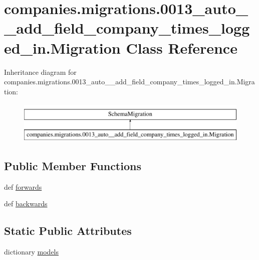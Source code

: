 \hypertarget{classcompanies_1_1migrations_1_10013__auto____add__field__company__times__logged__in_1_1_migration}{\section{companies.\-migrations.0013\-\_\-auto\-\_\-\-\_\-add\-\_\-field\-\_\-company\-\_\-times\-\_\-logged\-\_\-in.Migration Class Reference}
\label{classcompanies_1_1migrations_1_10013__auto____add__field__company__times__logged__in_1_1_migration}
}
Inheritance diagram for companies.\-migrations.0013\-\_\-auto\-\_\-\-\_\-add\-\_\-field\-\_\-company\-\_\-times\-\_\-logged\-\_\-in.Migration\-:\begin{figure}[H]
\begin{center}
\leavevmode
\includegraphics[height=2.000000cm]{classcompanies_1_1migrations_1_10013__auto____add__field__company__times__logged__in_1_1_migration}
\end{center}
\end{figure}
\subsection*{Public Member Functions}
\begin{DoxyCompactItemize}
\item 
def \hyperlink{classcompanies_1_1migrations_1_10013__auto____add__field__company__times__logged__in_1_1_migration_a26a0af430d99c0054c8e80672210e457}{forwards}
\item 
def \hyperlink{classcompanies_1_1migrations_1_10013__auto____add__field__company__times__logged__in_1_1_migration_a812aba8dcbe5ea614b9ec84042078d3e}{backwards}
\end{DoxyCompactItemize}
\subsection*{Static Public Attributes}
\begin{DoxyCompactItemize}
\item 
dictionary \hyperlink{classcompanies_1_1migrations_1_10013__auto____add__field__company__times__logged__in_1_1_migration_a58b872b3318cb4640a16f594915a5dcf}{models}
\end{DoxyCompactItemize}


